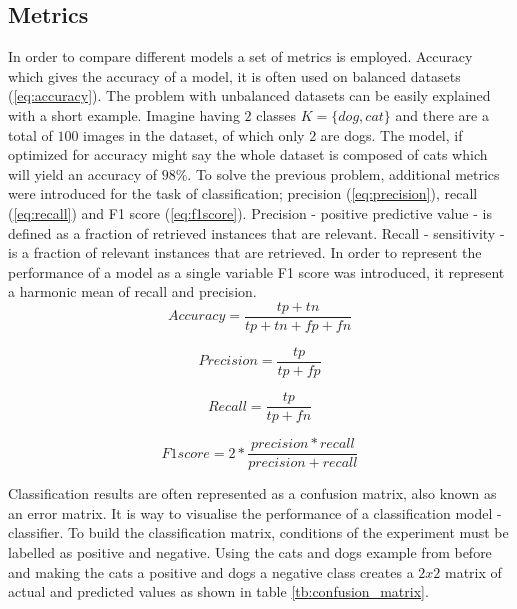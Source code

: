 \documentclass[times, utf8, diplomski]{fer}
\begin{document}
\subsection{Metrics}
\label{se:metrics}
In order to compare different models a set of metrics is employed. Accuracy which gives the accuracy of a model, it is often used on balanced datasets (\ref{eq:accuracy}). The problem with unbalanced datasets can be easily explained with a short example. Imagine having $2$ classes $K=\{dog,cat\}$ and there are a total of $100$ images in the dataset, of which only $2$ are dogs. The model, if optimized for accuracy might say the whole dataset is composed of cats which will yield an accuracy of $98\%$. To solve the previous problem, additional metrics were introduced for the task of classification; precision (\ref{eq:precision}), recall (\ref{eq:recall}) and F1 score (\ref{eq:f1score}). Precision - positive predictive value - is defined as a fraction of retrieved instances that are relevant. Recall - sensitivity - is a fraction of relevant instances that are retrieved. In order to represent the performance of a model as a single variable F1 score was introduced, it represent a harmonic mean of recall and precision.
\begin{equation} \label{eq:accuracy}
	Accuracy = \frac{tp + tn}{tp + tn + fp + fn}
\end{equation}

\begin{equation} \label{eq:precision}
	Precision = \frac{tp}{tp + fp}
\end{equation}

\begin{equation} \label{eq:recall}
	Recall = \frac{tp}{tp + fn}
\end{equation}

\begin{equation} \label{eq:f1score}
	F1 score = 2 * \frac{precision * recall}{precision + recall}
\end{equation}



Classification results are often represented as a confusion matrix, also known as an error matrix.  It is way to visualise the performance of a classification model - classifier. To build the classification matrix, conditions of the experiment must be labelled as positive and negative. Using the cats and dogs example from before and making the cats a positive and dogs a negative class creates a $2x2$ matrix of actual and predicted values as shown in table \ref{tb:confusion_matrix}.
\end{document}
